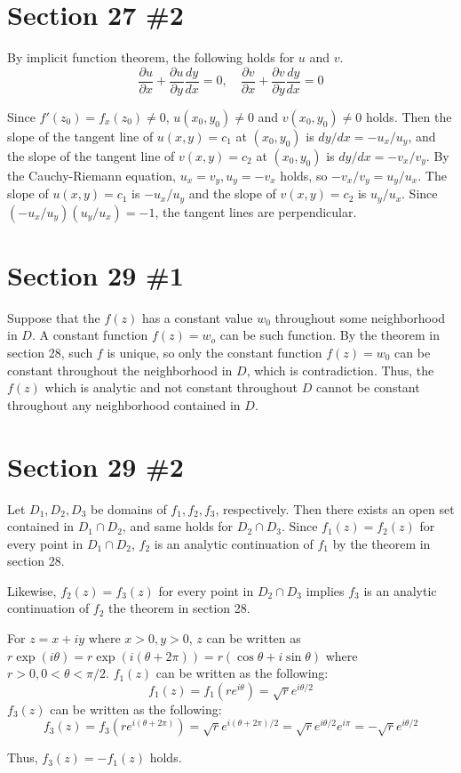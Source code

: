 \documentclass{scrartcl}
\begin{document}
\section{Section 27 \#2}
By implicit function theorem, the following holds for \(u\) and \(v\).
\[
  \frac{\partial u}{\partial x} + \frac{\partial u}{\partial y} \frac{dy}{dx} = 0, \quad \frac{\partial v}{\partial x} + \frac{\partial v}{\partial y} \frac{dy}{dx} = 0
\]

Since \(f'(z_0) = f_x(z_0) \not = 0\), \(u(x_0, y_0) \not = 0\) and \(v(x_0, y_0) \not = 0\) holds.
Then the slope of the tangent line of \(u(x, y) = c_1\) at \((x_0, y_0)\) is \(dy/dx = -u_x / u_y\), and the slope of the tangent line of \(v(x, y) = c_2\) at \((x_0, y_0)\) is \(dy/dx = -v_x / v_y\).
By the Cauchy-Riemann equation, \(u_x = v_y, u_y = -v_x\) holds, so \(-v_x / v_y = u_y / u_x\).
The slope of \(u(x, y) = c_1\) is \(-u_x / u_y\) and the slope of \(v(x, y) = c_2\) is \(u_y / u_x\).
Since \((-u_x / u_y)(u_y / u_x) = -1\), the tangent lines are perpendicular.

\section{Section 29 \#1}
Suppose that the \(f(z)\) has a constant value \(w_0\) throughout some neighborhood in \(D\).
A constant function \(f(z) = w_o\) can be such function.
By the theorem in section 28, such \(f\) is unique, so only the constant function \(f(z) = w_0\) can be constant throughout the neighborhood in \(D\), which is contradiction.
Thus, the \(f(z)\) which is analytic and not constant throughout \(D\) cannot be constant throughout any neighborhood contained in \(D\).

\section{Section 29 \#2}
Let \(D_1, D_2, D_3\) be domains of \(f_1, f_2, f_3\), respectively.
Then there exists an open set contained in \(D_1 \cap D_2\), and same holds for \(D_2 \cap D_3\).
Since \(f_1(z) = f_2(z)\) for every point in \(D_1 \cap D_2\), \(f_2\) is an analytic continuation of \(f_1\) by the theorem in section 28.

Likewise, \(f_2(z) = f_3(z)\) for every point in \(D_2 \cap D_3\) implies \(f_3\) is an analytic continuation of \(f_2\) the theorem in section 28.

For \(z = x + iy\) where \(x > 0, y > 0\), \(z\) can be written as \(r\exp(i\theta) = r\exp(i(\theta + 2\pi)) = r(\cos\theta + i\sin\theta)\) where \(r > 0, 0 < \theta < \pi / 2\).
\(f_1(z)\) can be written as the following:
\[
  f_1(z) = f_1(re^{i\theta}) = \sqrt{r}e^{i\theta / 2}
\]
\(f_3(z)\) can be written as the following:
\[
  f_3(z) = f_3(re^{i(\theta + 2\pi)}) = \sqrt{r}e^{i(\theta + 2\pi) / 2} = \sqrt{r}e^{i\theta / 2}e^{i\pi} = -\sqrt{r}e^{i\theta / 2}
\]

Thus, \(f_3(z) = -f_1(z)\) holds.
\end{document}
